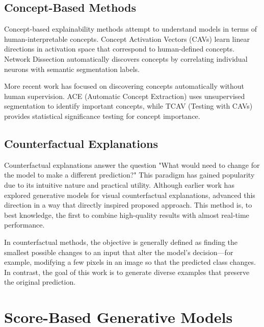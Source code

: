 \subsection{Concept-Based Methods}

Concept-based explainability methods attempt to understand models in terms of human-interpretable concepts. Concept Activation Vectors (CAVs) \citep{kim2018interpretabilityfeatureattributionquantitative} learn linear directions in activation space that correspond to human-defined concepts. Network Dissection \citep{bau2017networkdissectionquantifyinginterpretability} automatically discovers concepts by correlating individual neurons with semantic segmentation labels.

More recent work has focused on discovering concepts automatically without human supervision. ACE (Automatic Concept Extraction) \cite{ghorbani2019automaticconceptbasedexplanations} uses unsupervised segmentation to identify important concepts, while TCAV (Testing with CAVs) \cite{kim2018interpretabilityfeatureattributionquantitative} provides statistical significance testing for concept importance.

\subsection{Counterfactual Explanations}

Counterfactual explanations answer the question "What would need to change for the model to make a different prediction?" This paradigm has gained popularity due to its intuitive nature and practical utility. Although earlier work has explored generative models for visual counterfactual explanations, \cite{sobieski2024rethinkingvisualcounterfactualexplanations} advanced this direction in a way that directly inspired proposed approach. This method is, to best knowledge, the first to combine high-quality results with almost real-time performance.

In counterfactual methods, the objective is generally defined as finding the smallest possible changes to an input that alter the model’s decision—for example, modifying a few pixels in an image so that the predicted class changes. In contrast, the goal of this work is to generate diverse examples that preserve the original prediction.

\section{Score-Based Generative Models}\label{sec:sgm_background}

